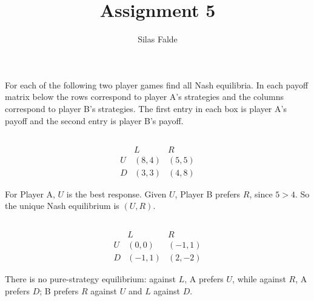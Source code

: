 \documentclass[newpages]{assignment}
\title{Assignment 5}
\author{Silas Falde}
\begin{document}
\maketitle
\tableofcontents

\section{}

\begin{problem}
    For each of the following two player games find all Nash equilibria. In each payoff matrix below the rows correspond to player A's strategies and the columns correspond to player B's strategies. The first entry in each box is player A's payoff and the second entry is player B's payoff.
\end{problem}

\subsection{}

\[
    \begin{array}{c|cc}
          & L      & R      \\
        \hline
        U & (8, 4) & (5, 5) \\
        D & (3, 3) & (4, 8)
    \end{array}
\]

\begin{solution}
    For Player A, \(U\) is the best response. Given \(U\),
    Player B prefers \(R\), since \(5>4\). So the unique Nash
    equilibrium is \((U,R)\).
\end{solution}

\subsection{}

\[
    \begin{array}{c|cc}
          & L       & R       \\
        \hline
        U & (0, 0)  & (-1, 1) \\
        D & (-1, 1) & (2, -2)
    \end{array}
\]

\begin{solution}
    There is no pure-strategy equilibrium: against \(L\), A prefers \(U\),
    while against \(R\), A prefers \(D\); B prefers \(R\) against \(U\) and
    \(L\) against \(D\).
\end{solution}
\end{document}
